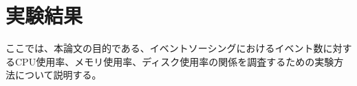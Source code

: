 \documentclass[../../main]{subfiles}
\begin{document}
    \section{実験結果}\label{sec:result}

    ここでは、本論文の目的である、イベントソーシングにおけるイベント数に対するCPU使用率、メモリ使用率、ディスク使用率の関係を調査するための実験方法について説明する。

    

    

    

    

    

    \clearpage
\end{document}
